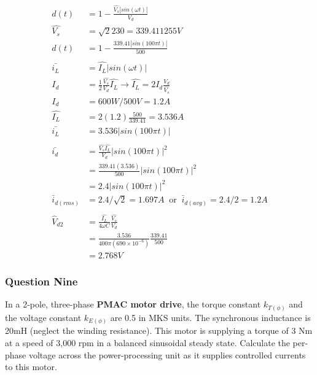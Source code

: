 \documentclass[a4paper,11pt]{article}
\begin{document}
\begin{align*}
    d(t)             & = 1-\frac{\hat{V_s}|sin(\omega t)|}{V_d}                                                       \\
    \hat{V_s}        & = \sqrt{2}230 = 339.411255V                                                                    \\
    d(t)             & = 1-\frac{339.41|sin(100\pi t)|}{500}                                                          \\\\
    \bar{i_L}        & = \hat{I_L}|sin(\omega t)|                                                                     \\
    I_d              & = \frac{1}{2}\frac{\hat{V_s}}{V_d}\hat{I_L} \rightarrow \hat{I_L} = 2I_d \frac{V_d}{\hat{V_s}} \\
    I_d              & = 600W/500V=1.2A                                                                               \\
    \hat{I_L}        & = 2(1.2) \frac{500}{339.41} = 3.536A                                                           \\
    \bar{i_L}        & = 3.536|sin(100\pi t)|                                                                         \\\\
    \bar{i_d}        & = \frac{\hat{V_s}\hat{I_L}}{V_d}|sin(100\pi t)|^2                                              \\
                     & = \frac{339.41(3.536)}{500}|sin(100\pi t)|^2                                                   \\
                     & = 2.4|sin(100\pi t)|^2                                                                         \\
    \bar{i}_{d(rms)} & = 2.4/\sqrt{2} = 1.697A \;\;\mathrm{or}\;\; \bar{i}_{d(avg)} = 2.4/2 = 1.2A                    \\\\
    \hat{V}_{d2}     & = \frac{\hat{I_L}}{4\omega C}\frac{\hat{V_s}}{V_d}                                             \\
                     & = \frac{3.536}{400\pi(690\times10^{-6})}\frac{339.41}{500}                                     \\
                     & = 2.768V
\end{align*}

\newpage
\subsubsection*{Question Nine}
In a 2-pole, three-phase \textbf{PMAC motor drive}, the torque constant $k_{T(\phi)}$ and the voltage constant $k_{E(\phi)}$ are 0.5 in MKS units. The synchronous inductance is 20mH (neglect the winding resistance). This motor is supplying a torque of 3 Nm at a speed of 3,000 rpm in a balanced sinusoidal steady state. Calculate the per-phase voltage across the power-processing unit as it supplies controlled currents to this motor.
\end{document}
